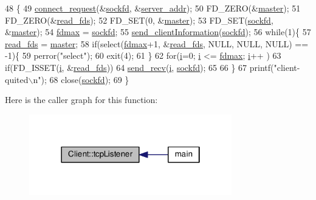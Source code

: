 \begin{DoxyCode}
48 \{
49     \hyperlink{class_client_a63a0074432524094592cc95ec3b8c31c}{connect\_request}(&\hyperlink{class_client_ab0cf9b759ba4da79ccb0a64242d944c4}{sockfd}, &\hyperlink{class_client_a3787f155329f63a3bae120e9deca92d6}{server\_addr});
50     FD\_ZERO(&\hyperlink{class_client_a56c611a99e0ba2a2efaddeb9ae021618}{master});
51     FD\_ZERO(&\hyperlink{class_client_a3631a848d923649af981576df2c83506}{read\_fds});
52     FD\_SET(0, &\hyperlink{class_client_a56c611a99e0ba2a2efaddeb9ae021618}{master});
53     FD\_SET(\hyperlink{class_client_ab0cf9b759ba4da79ccb0a64242d944c4}{sockfd}, &\hyperlink{class_client_a56c611a99e0ba2a2efaddeb9ae021618}{master});
54     \hyperlink{class_client_a99ae6181165c7b5119a4c93f3b1908c8}{fdmax} = \hyperlink{class_client_ab0cf9b759ba4da79ccb0a64242d944c4}{sockfd};
55     \hyperlink{class_client_a7aeddfbf62fb0044949597be14e91082}{send\_clientInformation}(\hyperlink{class_client_ab0cf9b759ba4da79ccb0a64242d944c4}{sockfd});
56     \textcolor{keywordflow}{while}(1)\{
57         \hyperlink{class_client_a3631a848d923649af981576df2c83506}{read\_fds} = \hyperlink{class_client_a56c611a99e0ba2a2efaddeb9ae021618}{master};
58         \textcolor{keywordflow}{if}(select(\hyperlink{class_client_a99ae6181165c7b5119a4c93f3b1908c8}{fdmax}+1, &\hyperlink{class_client_a3631a848d923649af981576df2c83506}{read\_fds}, NULL, NULL, NULL) == -1)\{
59             perror(\textcolor{stringliteral}{"select"});
60             exit(4);
61         \}
62         \textcolor{keywordflow}{for}(\hyperlink{class_client_a8086f64d20f268817ef23bc81cbea059}{i}=0; \hyperlink{class_client_a8086f64d20f268817ef23bc81cbea059}{i} <= \hyperlink{class_client_a99ae6181165c7b5119a4c93f3b1908c8}{fdmax}; \hyperlink{class_client_a8086f64d20f268817ef23bc81cbea059}{i}++ )
63             \textcolor{keywordflow}{if}(FD\_ISSET(\hyperlink{class_client_a8086f64d20f268817ef23bc81cbea059}{i}, &\hyperlink{class_client_a3631a848d923649af981576df2c83506}{read\_fds}))
64                 \hyperlink{class_client_a7d7ba78b63357fe2c7566018e30e9767}{send\_recv}(\hyperlink{class_client_a8086f64d20f268817ef23bc81cbea059}{i}, \hyperlink{class_client_ab0cf9b759ba4da79ccb0a64242d944c4}{sockfd});
65     
66     \}
67     printf(\textcolor{stringliteral}{"client-quited\(\backslash\)n"});
68     close(\hyperlink{class_client_ab0cf9b759ba4da79ccb0a64242d944c4}{sockfd});
69 \}
\end{DoxyCode}


Here is the caller graph for this function\+:
\nopagebreak
\begin{figure}[H]
\begin{center}
\leavevmode
\includegraphics[width=250pt]{class_client_a3e98bb9f68d2fc456e772bb88df85374_icgraph}
\end{center}
\end{figure}


